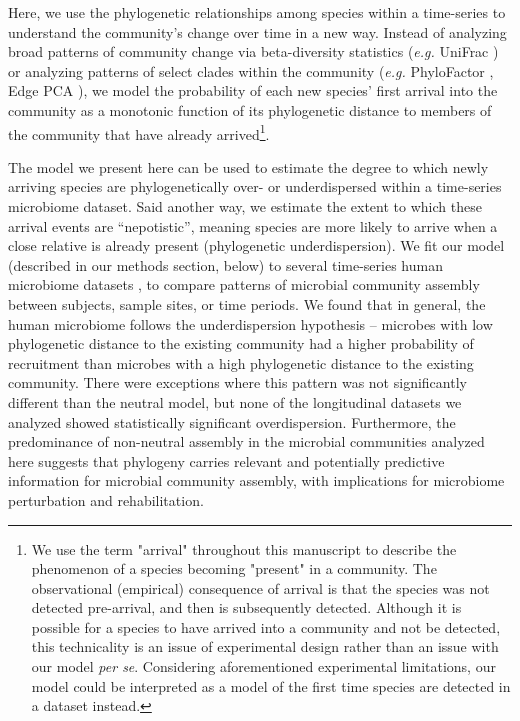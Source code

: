 \documentclass{article}
\begin{document}
Here, we use the phylogenetic relationships among species within a time-series to understand the community’s change over time in a new way. Instead of analyzing broad patterns of community change via beta-diversity statistics (\emph{e.g.} UniFrac \cite{Lozupone2005}) or analyzing patterns of select clades within the community (\emph{e.g.} PhyloFactor \cite{Washburne2017}, Edge PCA \cite{Matsen2013}), we model the probability of each new species’ first arrival into the community as a monotonic function of its phylogenetic distance to members of the community that have already arrived\footnote{We use the term "arrival" throughout this manuscript to describe the phenomenon of a species becoming "present" in a community. The observational (empirical) consequence of arrival is that the species was not detected pre-arrival, and then is subsequently detected. Although it is possible for a species to have arrived into a community and not be detected, this technicality is an issue of experimental design rather than an issue with our model \emph{per se}. Considering aforementioned experimental limitations, our model could be interpreted as a model of the first time species are detected in a dataset instead.}.
\par
The model we present here can be used to estimate the degree to which newly arriving species are phylogenetically over- or underdispersed within a time-series microbiome dataset. Said another way, we estimate the extent to which these arrival events are “nepotistic”, meaning species are more likely to arrive when a close relative is already present (phylogenetic underdispersion). We fit our model (described in our methods section, below) to several time-series human microbiome datasets \cite{Caporaso2011,Koenig2011,Yassour2016}, to compare patterns of microbial community assembly between subjects, sample sites, or time periods. We found that in general, the human microbiome follows the underdispersion hypothesis – microbes with low phylogenetic distance to the existing community had a higher probability of recruitment than microbes with a high phylogenetic distance to the existing community. There were exceptions where this pattern was not significantly different than the neutral model, but none of the longitudinal datasets we analyzed showed statistically significant overdispersion. Furthermore, the predominance of non-neutral assembly in the microbial communities analyzed here suggests that phylogeny carries relevant and potentially predictive information for microbial community assembly, with implications for microbiome perturbation and rehabilitation. 
\\\par
\end{document}
